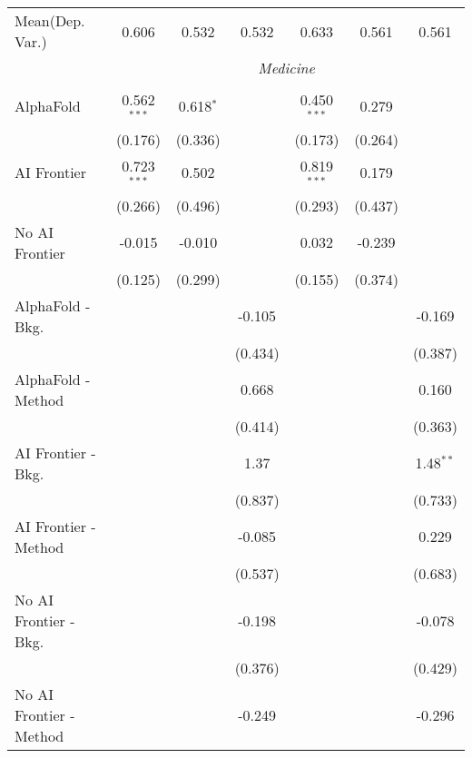 \begin{tabular}{lcccccc}
Mean(Dep. Var.) & 0.606 & 0.532 & 0.532 & 0.633 & 0.561 & 0.561 \\
 & \multicolumn{6}{c}{\textit{Medicine}} \\ \\
   AlphaFold               & 0.562$^{***}$ & 0.618$^{*}$ &         & 0.450$^{***}$ & 0.279   &   \\   
                           & (0.176)       & (0.336)     &         & (0.173)       & (0.264) &   \\   
   AI Frontier             & 0.723$^{***}$ & 0.502       &         & 0.819$^{***}$ & 0.179   &   \\   
                           & (0.266)       & (0.496)     &         & (0.293)       & (0.437) &   \\   
   No AI Frontier          & -0.015        & -0.010      &         & 0.032         & -0.239  &   \\   
                           & (0.125)       & (0.299)     &         & (0.155)       & (0.374) &   \\   
   AlphaFold - Bkg.        &               &             & -0.105  &               &         & -0.169\\   
                           &               &             & (0.434) &               &         & (0.387)\\   
   AlphaFold - Method      &               &             & 0.668   &               &         & 0.160\\   
                           &               &             & (0.414) &               &         & (0.363)\\   
   AI Frontier - Bkg.      &               &             & 1.37    &               &         & 1.48$^{**}$\\   
                           &               &             & (0.837) &               &         & (0.733)\\   
   AI Frontier - Method    &               &             & -0.085  &               &         & 0.229\\   
                           &               &             & (0.537) &               &         & (0.683)\\   
   No AI Frontier - Bkg.   &               &             & -0.198  &               &         & -0.078\\   
                           &               &             & (0.376) &               &         & (0.429)\\   
   No AI Frontier - Method &               &             & -0.249  &               &         & -0.296\\   

\end{tabular}
